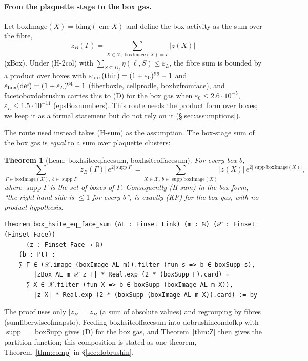\documentclass[11pt,a4paper]{article}
\newtheorem{theorem}{Theorem}[section]
\theoremstyle{definition}
\theoremstyle{remark}
\DeclareRobustCommand{\lean}[1]{{\ttfamily\renewcommand{\_}{\textunderscore\allowbreak}#1}}
\newenvironment{leanquote}{\par\smallskip\footnotesize}{\par\smallskip}
\newcommand{\enc}{\operatorname{enc}}
\newcommand{\supp}{\operatorname{supp}}
\begin{document}
\paragraph{From the plaquette stage to the box gas.} Let $\mathrm{boxImage}(X)=\mathrm{bimg}(\enc X)$ and define the box activity as the sum over the fibre,
\[
z_B(\Gamma)=\sum_{X\in\mathcal X,\ \mathrm{boxImage}(X)=\Gamma}|z(X)|
\]
(\lean{zBox}). Under (H-2col) with $\sum_{S\subseteq D_\ell}\eta(\ell,S)\le\varepsilon_L$, the fibre sum is bounded by a product over boxes with $\varepsilon_{\rm box}(\text{thin})=(1+\varepsilon_0)^{96}-1$ and $\varepsilon_{\rm box}(\text{def})=(1+\varepsilon_L)^{64}-1$ (\lean{fiber\_box\_le}, \lean{cell\_prod\_le}, \lean{box\_hz\_from\_face}), and \lean{face\_to\_box\_dobrushin} carries this to (D) for the box gas when $\varepsilon_0\le2.6\cdot10^{-5}$, $\varepsilon_L\le1.5\cdot10^{-11}$ (\lean{epsBox\_numbers}). This route needs the product form over boxes; we keep it as a formal statement but do not rely on it (\S\ref{sec:assumptions}).

The route used instead takes (H-sum) as the assumption. The box-stage sum of the box gas is \emph{equal} to a sum over plaquette clusters:

\begin{theorem}[Lean: \lean{box\_hsite\_eq\_face\_sum}, \lean{box\_hsite\_of\_face\_sum}]\label{thm:eq}
For every box $b$,
\[
\sum_{\Gamma\in\mathrm{boxImage}(\mathcal X),\ b\in\supp\Gamma}|z_B(\Gamma)|\,e^{2|\supp\Gamma|}
=\sum_{X\in\mathcal X,\ b\in\supp\mathrm{boxImage}(X)}|z(X)|\,e^{2|\supp\mathrm{boxImage}(X)|},
\]
where $\supp\Gamma$ is the set of boxes of $\Gamma$. Consequently (H-sum) in the box form, ``the right-hand side is $\le1$ for every $b$'', is exactly (KP) for the box gas, with no product hypothesis.
\end{theorem}
\begin{leanquote}
\begin{verbatim}
theorem box_hsite_eq_face_sum (ΛL : Finset Link) (m : ℕ) (𝒳 : Finset (Finset Face))
      (z : Finset Face → ℝ)
    (b : Pt) :
    ∑ Γ ∈ (𝒳.image (boxImage ΛL m)).filter (fun s => b ∈ boxSupp s),
        |zBox ΛL m 𝒳 z Γ| * Real.exp (2 * (boxSupp Γ).card) =
      ∑ X ∈ 𝒳.filter (fun X => b ∈ boxSupp (boxImage ΛL m X)),
        |z X| * Real.exp (2 * (boxSupp (boxImage ΛL m X)).card) := by
\end{verbatim}
\end{leanquote}
The proof uses only $|z_B|=z_B$ (a sum of absolute values) and regrouping by fibres (\lean{sum\_fiberwise\_of\_maps\_to}). Feeding \lean{box\_hsite\_of\_face\_sum} into \lean{dobrushin\_cond\_of\_kp} with $\supp=$ \lean{boxSupp} gives (D) for the box gas, and Theorem~\ref{thm:Z} then gives the partition function; this composition is stated as one theorem, Theorem~\ref{thm:comp} in \S\ref{sec:dobrushin}.
\end{document}
